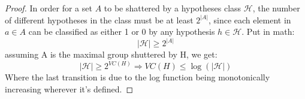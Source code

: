 \subsubsection{}
\begin{proof}
    In order for a set $A$ to be shattered by a hypotheses class $\mathcal{H}$, the number of different hypotheses in the class must be at least $2^{|A|}$, 
    since each element in $a \in A$ can be classified as either 1 or 0 by any hypothesis $h \in \mathcal{H}$. Put in math:
\begin{equation*}
    |\mathcal{H}| \geq 2^{|A|}
\end{equation*}
    assuming A is the maximal group shuttered by H, we get:
    \begin{equation*}
        |\mathcal{H}| \geq 2^{VC(H)} \Rightarrow VC(H) \leq \log (|\mathcal{H}|)
    \end{equation*}
    Where the last transition is due to the log function being monotonically increasing wherever it's defined.
\end{proof}

